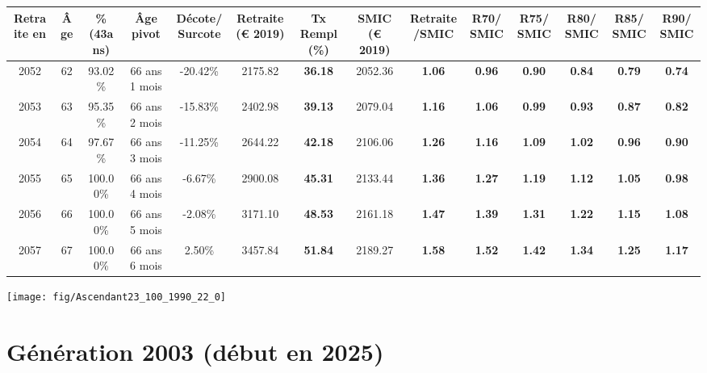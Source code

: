 \begin{adjustbox}{max width=\textwidth} 
\begin{tabular}[htb]{|c|c||c|c|c||c|c||c|c||c|c|c|c|c|} 
\hline 
 Retraite en &  Âge &  \%(43ans) &  Âge pivot &  Décote/Surcote &  Retraite (\euro{} 2019) &  Tx Rempl(\%) &  SMIC (\euro{} 2019) &  Retraite/SMIC &  R70/SMIC &  R75/SMIC &  R80/SMIC &  R85/SMIC &  R90/SMIC \\ 
\hline \hline 
 2052 &  62 &  93.02\% &  66 ans 1 mois &  -20.42\% &  2175.82 &  {\bf 36.18} &  2052.36 &  {\bf 1.06} &  {\bf {\color{red} 0.96}} &  {\bf {\color{red} 0.90}} &  {\bf {\color{red} 0.84}} &  {\bf {\color{red} 0.79}} &  {\bf {\color{red} 0.74}} \\ 
\hline 
 2053 &  63 &  95.35\% &  66 ans 2 mois &  -15.83\% &  2402.98 &  {\bf 39.13} &  2079.04 &  {\bf 1.16} &  {\bf 1.06} &  {\bf {\color{red} 0.99}} &  {\bf {\color{red} 0.93}} &  {\bf {\color{red} 0.87}} &  {\bf {\color{red} 0.82}} \\ 
\hline 
 2054 &  64 &  97.67\% &  66 ans 3 mois &  -11.25\% &  2644.22 &  {\bf 42.18} &  2106.06 &  {\bf 1.26} &  {\bf 1.16} &  {\bf 1.09} &  {\bf 1.02} &  {\bf {\color{red} 0.96}} &  {\bf {\color{red} 0.90}} \\ 
\hline 
 2055 &  65 &  100.00\% &  66 ans 4 mois &  -6.67\% &  2900.08 &  {\bf 45.31} &  2133.44 &  {\bf 1.36} &  {\bf 1.27} &  {\bf 1.19} &  {\bf 1.12} &  {\bf 1.05} &  {\bf {\color{red} 0.98}} \\ 
\hline 
 2056 &  66 &  100.00\% &  66 ans 5 mois &  -2.08\% &  3171.10 &  {\bf 48.53} &  2161.18 &  {\bf 1.47} &  {\bf 1.39} &  {\bf 1.31} &  {\bf 1.22} &  {\bf 1.15} &  {\bf 1.08} \\ 
\hline 
 2057 &  67 &  100.00\% &  66 ans 6 mois &  2.50\% &  3457.84 &  {\bf 51.84} &  2189.27 &  {\bf 1.58} &  {\bf 1.52} &  {\bf 1.42} &  {\bf 1.34} &  {\bf 1.25} &  {\bf 1.17} \\ 
\hline 
\hline 
\end{tabular} 
\end{adjustbox} 
 
 \vspace{0.1cm} 

 {\hspace{-2.2cm}\texttt{[image: fig/Ascendant23\_100\_1990\_22\_0]}} 

\newpage 
 
\section{Génération 2003 (début en 2025)\label{Ascendant23_100_2003_22_0}} 
 
